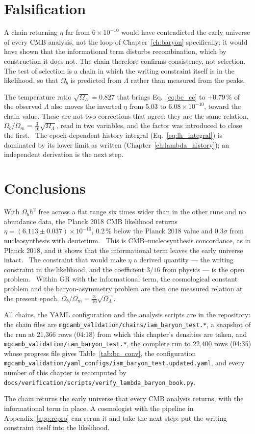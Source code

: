 \section{Falsification}\label{sec:bc_falsify}
A chain returning $\eta$ far from $6\times10^{-10}$ would have contradicted the early universe of every CMB analysis, not the loop of
Chapter~\ref{ch:baryon} specifically; it would have shown that the informational term disturbs recombination, which by construction it
does not. The chain therefore confirms consistency, not selection. The test of selection is a chain in which the writing constraint
itself is in the likelihood, so that $\Omega_b$ is predicted from $\Lambda$ rather than measured from the peaks. \openprob

The temperature ratio $\sqrt{\Omega_\Lambda}=0.827$ that brings Eq.~\eqref{eq:bc_cc} to $+0.79\,\%$ of the observed $\Lambda$ also moves
the inverted $\eta$ from $5.03$ to $6.08\times10^{-10}$, toward the chain value. These are not two corrections that agree: they are the
same relation, $\Omega_b/\Omega_m=\tfrac3{16}\sqrt{\Omega_\Lambda}$, read in two variables, and the factor was introduced to close the
first. \fitted\ The epoch-dependent history integral (Eq.~\eqref{eq:lh_integral}) is dominated by its lower limit as
written (Chapter~\ref{ch:lambda_history}); an independent derivation is the next step. \openprob

\section{Conclusions}\label{sec:bc_concl}
With $\Omega_bh^2$ free across a flat range six times wider than in the other runs and no abundance data, the Planck 2018 CMB likelihood
returns $\eta=(6.113\pm0.037)\times10^{-10}$, $0.2\,\%$ below the Planck 2018 value and $0.3\sigma$ from nucleosynthesis with
deuterium. \measured\ This is CMB--nucleosynthesis concordance, as in Planck 2018, and it shows that the informational term leaves the
early universe intact. \observed\ The constraint that would make $\eta$ a derived quantity --- the writing constraint in the likelihood,
and the coefficient $3/16$ from physics --- is the open problem. \openprob\ Within GR with the informational term, the cosmological
constant problem and the baryon-asymmetry problem are then one measured relation at the present epoch,
$\Omega_b/\Omega_m=\tfrac3{16}\sqrt{\Omega_\Lambda}$. \observed

All chains, the YAML configuration and the analysis scripts are in the repository: the chain files are
\texttt{mgcamb\_validation/\allowbreak{}chains/\allowbreak{}iam\_baryon\_test.*}, a snapshot of the run at 21,366 rows (04:18) from which this chapter's densities are taken, and \texttt{mgcamb\_validation/\allowbreak{}iam\_baryon\_test.*}, the complete run to 22,400 rows (04:35) whose progress file gives Table~\ref{tab:bc_conv}, the configuration
\texttt{mgcamb\_validation/\allowbreak{}yaml\_configs/\allowbreak{}iam\_baryon\_test.updated.yaml}, and every number of this chapter is
recomputed by \texttt{docs/verification/\allowbreak{}scripts/\allowbreak{}verify\_lambda\_baryon\_book.py}.

The chain returns the early universe that every CMB analysis returns, with the informational term in place. A cosmologist with the pipeline in Appendix~\ref{app:repro} can rerun it and take the next step: put the writing constraint itself into the likelihood.

